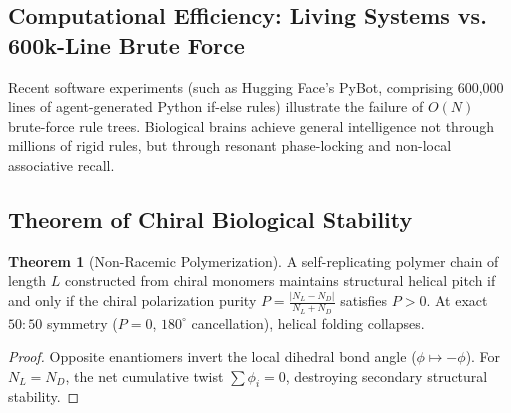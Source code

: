 \documentclass[11pt,a4paper,oneside]{article}
\def\texttt#1{#1}%
\theoremstyle{definition}
\newtheorem{theorem}{Theorem}[section]
\begin{document}
\subsection{Computational Efficiency: Living Systems vs. 600k-Line Brute Force}
Recent software experiments (such as Hugging Face's \texttt{PyBot}, comprising 600,000 lines of agent-generated Python if-else rules) illustrate the failure of $O(N)$ brute-force rule trees. Biological brains achieve general intelligence not through millions of rigid rules, but through resonant phase-locking and non-local associative recall.
\subsection{Theorem of Chiral Biological Stability}
\begin{theorem}[Non-Racemic Polymerization]
A self-replicating polymer chain of length $L$ constructed from chiral monomers maintains structural helical pitch if and only if the chiral polarization purity $P = \frac{|N_L - N_D|}{N_L + N_D}$ satisfies $P > 0$. At exact $50:50$ symmetry ($P = 0$, $180^\circ$ cancellation), helical folding collapses.
\end{theorem}
\begin{proof}
Opposite enantiomers invert the local dihedral bond angle ($\phi \mapsto -\phi$). For $N_L = N_D$, the net cumulative twist $\sum \phi_i = 0$, destroying secondary structural stability.
\end{proof}
\end{document}

